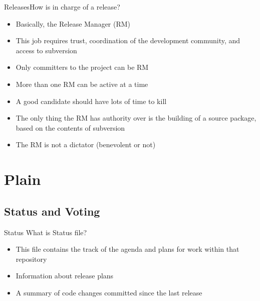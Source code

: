 \documentclass[10pt]{beamer}
\begin{document}
\begin{frame}{Releases}{How is in charge of a release?}
  \begin{itemize}
    \item Basically, the Release Manager (RM) \pause
    \item This job requires trust, coordination of the development community,
          and access to subversion \pause
    \item Only committers to the project can be RM \pause
    \item More than one RM can be active at a time \pause
    \item A good candidate should have lots of time to kill \pause
    \item The only thing the RM has authority over is the building of a
          source package, based on the contents of subversion \pause
    \item The RM is not a dictator (benevolent or not)
  \end{itemize}
\end{frame}

\section{Plain}

\subsection{Status and Voting}
\begin{frame}{Status}
  What is Status file? \pause
  \begin{itemize}
    \item This file contains the track of the agenda and plans for work within
          that repository \pause
    \item Information about release plans \pause
    \item A summary of code changes committed since the last release
  \end{itemize}
\end{frame}
\end{document}
